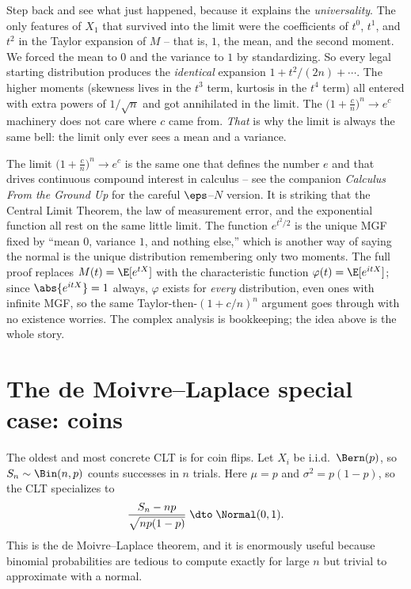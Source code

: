 \begin{whybox}
Step back and see what just happened, because it explains the \emph{universality}. The
only features of $X_1$ that survived into the limit were the coefficients of $t^0$,
$t^1$, and $t^2$ in the Taylor expansion of $M$ -- that is, $1$, the mean, and the
second moment. We forced the mean to $0$ and the variance to $1$ by standardizing. So
every legal starting distribution produces the \emph{identical} expansion
$1 + t^2/(2n) + \cdots$. The higher moments (skewness lives in the $t^3$ term, kurtosis
in the $t^4$ term) all entered with extra powers of $1/\sqrt n$ and got annihilated in
the limit. The $\big(1 + \tfrac{c}{n}\big)^n \to e^c$ machinery does not care where $c$
came from. \emph{That} is why the limit is always the same bell: the limit only ever
sees a mean and a variance.
\end{whybox}

\begin{connectionbox}
The limit $\big(1 + \frac{c}{n}\big)^n \to e^c$ is the same one that defines the number
$e$ and that drives continuous compound interest in calculus -- see the companion
\emph{Calculus From the Ground Up} for the careful $\eps$--$N$ version. It is striking
that the Central Limit Theorem, the law of measurement error, and the exponential
function all rest on the same little limit. The function $e^{t^2/2}$ is the unique MGF
fixed by ``mean $0$, variance $1$, and nothing else,'' which is another way of saying the
normal is the unique distribution remembering only two moments. The full proof replaces
$M(t)=\E[e^{tX}]$ with the characteristic function $\varphi(t)=\E[e^{itX}]$; since
$\abs{e^{itX}}=1$ always, $\varphi$ exists for \emph{every} distribution, even ones with
infinite MGF, so the same Taylor-then-$(1+c/n)^n$ argument goes through with no
existence worries. The complex analysis is bookkeeping; the idea above is the whole
story.
\end{connectionbox}

\section{The de Moivre--Laplace special case: coins}
\label{ch21:demoivre}

The oldest and most concrete CLT is for coin flips. Let $X_i$ be i.i.d.\ $\Bern(p)$, so
$S_n \sim \Bin(n, p)$ counts successes in $n$ trials. Here $\mu = p$ and
$\sigma^2 = p(1-p)$, so the CLT specializes to
\[
  \frac{S_n - np}{\sqrt{n p (1-p)}} \;\dto\; \Normal(0,1).
\]
This is the de Moivre--Laplace theorem, and it is enormously useful because binomial
probabilities are tedious to compute exactly for large $n$ but trivial to approximate
with a normal.

